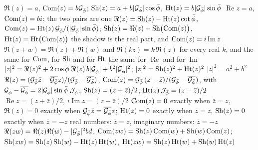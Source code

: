 \begin{gnlawswide}
  {$\Re(z) = a$, \quad $\Com(z) = b\Gp$; \newline $\Sh(z) = a + b|\Gp|\cos\pb$, \quad $\Ht(z) = b|\Gp|\sin\pb$}
  {$\operatorname{Re} z = a$, \quad $\Com(z) = bi$; \newline the two pairs are one}
  {$\Re(z) = \Sh(z) - \Ht(z)\cot\pb$, \quad $\Com(z) = \Ht(z)\,\Gp/(|\Gp|\sin\pb)$; \newline $\Sh(z) = \Re(z) + \Sh\bigl(\Com(z)\bigr)$, \quad $\Ht(z) = \Ht\bigl(\Com(z)\bigr)$}
  {the shadow is the real part, and $\Com(z) = i\operatorname{Im} z$}
  {$\Re(z + w) = \Re(z) + \Re(w)$ and $\Re(kz) = k\,\Re(z)$ for every real $k$, and the same for $\Com$, for $\Sh$ and for $\Ht$}
  {the same for $\operatorname{Re}$ \newline and for $\operatorname{Im}$}
  {$|z|^2 = \Re(z)^2 + 2\cos\pb\;\Re(z)\,b|\Gp| + b^2|\Gp|^2$; \newline $|z|^2 = \Sh(z)^2 + \Ht(z)^2$}
  {$|z|^2 = a^2 + b^2$}
  {$\Re(z) = (\Gp\bar{z} - \overline{\Gp}z)/(\Gp - \overline{\Gp})$, \quad $\Com(z) = \Gp\,(z - \bar{z})/(\Gp - \overline{\Gp})$, \newline with $\Gp - \overline{\Gp} = 2|\Gp|\sin\pb\;\Jp$; \newline $\Sh(z) = (z + \bar{z})/2$, \quad $\Ht(z)\,\Jp = (z - \bar{z})/2$}
  {$\operatorname{Re} z = (z + \bar{z})/2$, \newline $i\operatorname{Im} z = (z - \bar{z})/2$}
  {$\Com(z) = 0$ exactly when $\bar{z} = z$, \newline $\Re(z) = 0$ exactly when $\Gp\bar{z} = \overline{\Gp}z$; \newline $\Ht(z) = 0$ exactly when $\bar{z} = z$, \newline $\Sh(z) = 0$ exactly when $\bar{z} = -z$}
  {real numbers: $\bar{z} = z$, \newline imaginary numbers: $\bar{z} = -z$}
  {$\Re(zw) = \Re(z)\Re(w) - |\Gp|^2 bd$, \newline $\Com(zw) = \Sh(z)\Com(w) + \Sh(w)\Com(z)$; \newline $\Sh(zw) = \Sh(z)\Sh(w) - \Ht(z)\Ht(w)$, \newline $\Ht(zw) = \Sh(z)\Ht(w) + \Sh(w)\Ht(z)$}

\end{gnlawswide}
